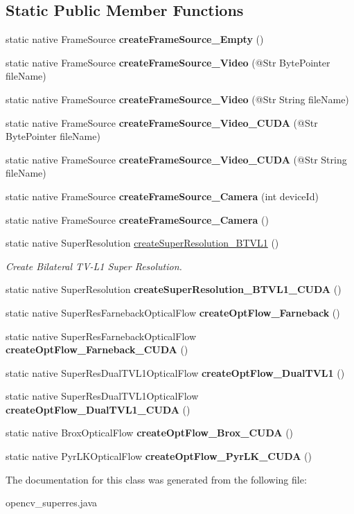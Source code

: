 \subsection*{Static Public Member Functions}
\begin{DoxyCompactItemize}
\item 
static native Frame\+Source {\bfseries create\+Frame\+Source\+\_\+\+Empty} ()
\item 
static native Frame\+Source {\bfseries create\+Frame\+Source\+\_\+\+Video} (@Str Byte\+Pointer file\+Name)
\item 
static native Frame\+Source {\bfseries create\+Frame\+Source\+\_\+\+Video} (@Str String file\+Name)
\item 
static native Frame\+Source {\bfseries create\+Frame\+Source\+\_\+\+Video\+\_\+\+C\+U\+DA} (@Str Byte\+Pointer file\+Name)
\item 
static native Frame\+Source {\bfseries create\+Frame\+Source\+\_\+\+Video\+\_\+\+C\+U\+DA} (@Str String file\+Name)
\item 
static native Frame\+Source {\bfseries create\+Frame\+Source\+\_\+\+Camera} (int device\+Id)
\item 
static native Frame\+Source {\bfseries create\+Frame\+Source\+\_\+\+Camera} ()
\item 
static native Super\+Resolution \hyperlink{group__superres_gac2dfc5e8422832bbb249c6675e7cb851}{create\+Super\+Resolution\+\_\+\+B\+T\+V\+L1} ()
\begin{DoxyCompactList}\small\item\em Create Bilateral T\+V-\/\+L1 Super Resolution. \end{DoxyCompactList}\item 
static native Super\+Resolution {\bfseries create\+Super\+Resolution\+\_\+\+B\+T\+V\+L1\+\_\+\+C\+U\+DA} ()
\item 
static native Super\+Res\+Farneback\+Optical\+Flow {\bfseries create\+Opt\+Flow\+\_\+\+Farneback} ()
\item 
static native Super\+Res\+Farneback\+Optical\+Flow {\bfseries create\+Opt\+Flow\+\_\+\+Farneback\+\_\+\+C\+U\+DA} ()
\item 
static native Super\+Res\+Dual\+T\+V\+L1\+Optical\+Flow {\bfseries create\+Opt\+Flow\+\_\+\+Dual\+T\+V\+L1} ()
\item 
static native Super\+Res\+Dual\+T\+V\+L1\+Optical\+Flow {\bfseries create\+Opt\+Flow\+\_\+\+Dual\+T\+V\+L1\+\_\+\+C\+U\+DA} ()
\item 
static native Brox\+Optical\+Flow {\bfseries create\+Opt\+Flow\+\_\+\+Brox\+\_\+\+C\+U\+DA} ()
\item 
static native Pyr\+L\+K\+Optical\+Flow {\bfseries create\+Opt\+Flow\+\_\+\+Pyr\+L\+K\+\_\+\+C\+U\+DA} ()
\end{DoxyCompactItemize}


The documentation for this class was generated from the following file\+:\begin{DoxyCompactItemize}
\item 
opencv\+\_\+superres.\+java\end{DoxyCompactItemize}
